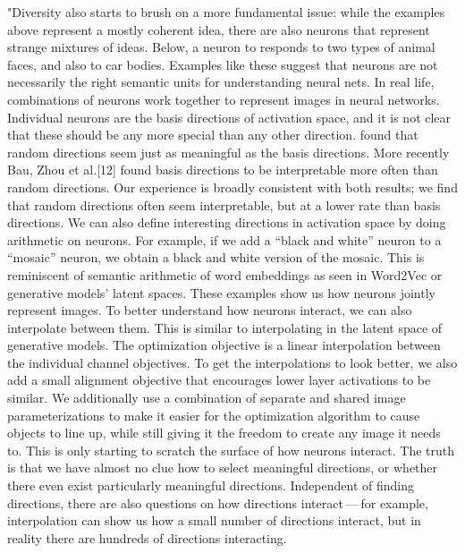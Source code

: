 \documentclass[]{scrartcl}
\begin{document}
"Diversity also starts to brush on a more fundamental issue: while the examples above represent a mostly coherent idea, there are also neurons that represent strange mixtures of ideas. Below, a neuron to responds to two types of animal faces, and also to car bodies. Examples like these suggest that neurons are not necessarily the right semantic units for understanding neural nets.  In real life, combinations of neurons work together to represent images in neural networks. Individual neurons are the basis directions of activation space, and it is not clear that these should be any more special than any other direction. \cite{Szegedy2013} found that random directions seem just as meaningful as the basis directions. More recently Bau, Zhou et al.[12] found basis directions to be interpretable more often than random directions. Our experience is broadly consistent with both results; we ﬁnd that random directions often seem interpretable, but at a lower rate than basis directions. We can also deﬁne interesting directions in activation space by doing arithmetic on neurons. For example, if we add a “black and white” neuron to a “mosaic” neuron, we obtain a black and white version of the mosaic. This is reminiscent of semantic arithmetic of word embeddings as seen in Word2Vec or generative models’ latent spaces. These examples show us how neurons jointly represent images. To better understand how neurons interact, we can also interpolate between them. This is similar to interpolating in the latent space of generative models. The optimization objective is a linear interpolation between the individual channel objectives. To get the interpolations to look better, we also add a small alignment objective that encourages lower layer activations to be similar. We additionally use a combination of separate and shared image parameterizations to make it easier for the optimization algorithm to cause objects to line up, while still giving it the freedom to create any image it needs to. This is only starting to scratch the surface of how neurons interact. The truth is that we have almost no clue how to select meaningful directions, or whether there even exist particularly meaningful directions. Independent of ﬁnding directions, there are also questions on how directions interact — for example, interpolation can show us how a small number of directions interact, but in reality there are hundreds of directions interacting.
\end{document}
